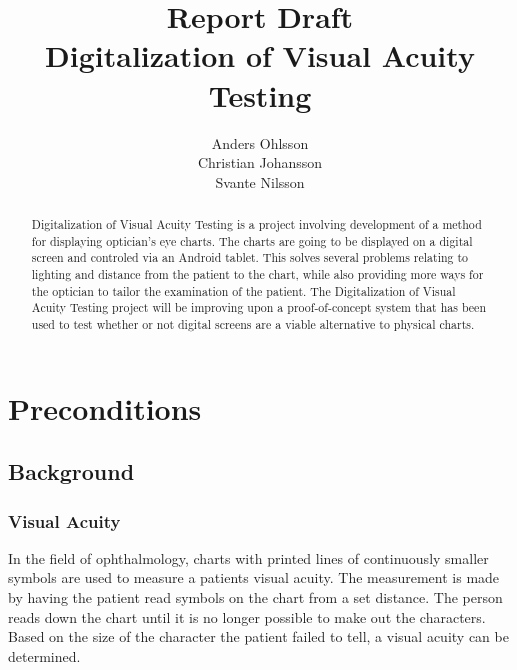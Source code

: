 \documentclass[12pt,a4paper,notitlepage]{report}
\begin{document}
\title{Report Draft\\Digitalization of Visual Acuity Testing}
\author{Anders Ohlsson\\Christian Johansson\\Svante Nilsson}
\maketitle

\begin{abstract}
Digitalization of Visual Acuity Testing is a project involving development of a method for displaying optician's eye charts. The charts are going to be displayed on a digital screen and controled via an Android tablet. This solves several problems relating to lighting and distance from the patient to the chart, while also providing more ways for the optician to tailor the examination of the patient. The Digitalization of Visual Acuity Testing project will be improving upon a proof-of-concept system that has been used to test whether or not digital screens are a viable alternative to physical charts.
\end{abstract}
\thispagestyle{empty}
\clearpage

\setcounter{page}{1}
\chapter{Preconditions}

\section{Background}
\subsection{Visual Acuity}
In the field of ophthalmology, charts with printed lines of continuously smaller symbols are used to measure a patients visual acuity. The measurement is made by having the patient read symbols on the chart from a set distance. The person reads down the chart until it is no longer possible to make out the characters. Based on the size of the character the patient failed to tell, a visual acuity can be determined. 
\end{document}

